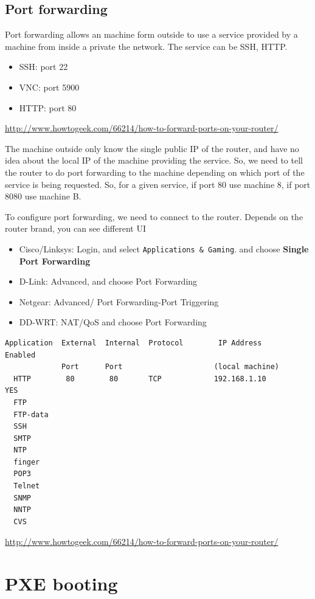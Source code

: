 \subsection{Port forwarding}
\label{sec:port_forwarding}

Port forwarding allows an machine form outside to use a service provided by  a
machine from inside a private the network.  The service can be SSH, HTTP.
\begin{itemize}
  \item SSH: port 22
  \item VNC: port 5900
  \item HTTP: port 80
\end{itemize}
\url{http://www.howtogeek.com/66214/how-to-forward-ports-on-your-router/}

The machine outside only know the single public IP of the router, and have no
idea about the local IP of the machine providing the service. So, we need to
tell the router to do port forwarding to the machine depending on which port of
the service is being requested. So, for a given service, if port 80 use machine
8, if port 8080 use machine B.

To configure port forwarding, we need to connect to the router. Depends on the
router brand, you can see different UI
\begin{itemize}
  \item Cisco/Linksys: Login, and
select \verb!Applications & Gaming!. and choose {\bf Single Port Forwarding}

  \item D-Link: Advanced, and choose Port Forwarding
  \item Netgear: Advanced/ Port Forwarding-Port Triggering
  \item DD-WRT: NAT/QoS and choose Port Forwarding
\end{itemize}
\begin{verbatim}
Application  External  Internal  Protocol        IP Address         Enabled
             Port      Port                     (local machine)
  HTTP        80        80       TCP            192.168.1.10           YES
  FTP
  FTP-data
  SSH
  SMTP
  NTP
  finger
  POP3
  Telnet
  SNMP
  NNTP
  CVS
\end{verbatim}
\url{http://www.howtogeek.com/66214/how-to-forward-ports-on-your-router/}


\section{PXE booting}
\label{sec:PXE_booting}

